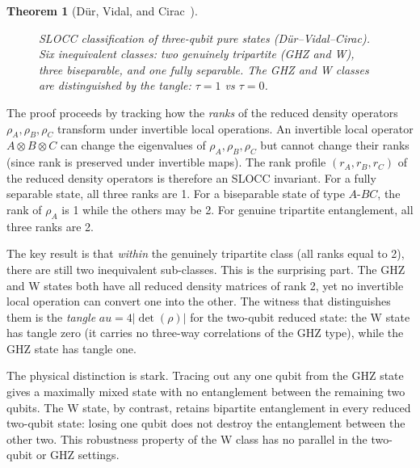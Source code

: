 \documentclass[12pt, a4paper, oneside]{report}
\theoremstyle{plain}
\newtheorem{theorem}{Theorem}[chapter]
\theoremstyle{definition}
\theoremstyle{remark}
\begin{document}
\begin{theorem}[Dür, Vidal, and Cirac~\cite{dur2000}]
\begin{figure}[htbp]
		\caption{SLOCC classification of three-qubit pure states (D\"{u}r--Vidal--Cirac). Six inequivalent classes: two genuinely tripartite (GHZ and W), three biseparable, and one fully separable. The GHZ and W classes are distinguished by the tangle: $\tau = 1$ vs $\tau = 0$.}
		\label{fig:sloce-classes}
	\end{figure}
\end{theorem}

The proof proceeds by tracking how the \emph{ranks} of the reduced density operators
$\rho_A, \rho_B, \rho_C$ transform under invertible local operations. An invertible local
operator $A \otimes B \otimes C$ can change the eigenvalues of $\rho_A, \rho_B, \rho_C$
but cannot change their ranks (since rank is preserved under invertible maps). The rank
profile $(r_A, r_B, r_C)$ of the reduced density operators is therefore an SLOCC invariant.
For a fully separable state, all three ranks are 1. For a biseparable state of type $A$-$BC$,
the rank of $\rho_A$ is 1 while the others may be 2. For genuine tripartite entanglement,
all three ranks are 2.

The key result is that \emph{within} the genuinely tripartite class (all ranks equal to 2),
there are still two inequivalent sub-classes. This is the surprising part. The GHZ and W
states both have all reduced density matrices of rank 2, yet no invertible local operation
can convert one into the other. The witness that distinguishes them is the \emph{tangle}
$	au = 4|\det(\rho)|$ for the two-qubit reduced state: the W state has tangle zero (it
carries no three-way correlations of the GHZ type), while the GHZ state has tangle one.

The physical distinction is stark. Tracing out any one qubit from the GHZ state gives a
maximally mixed state with no entanglement between the remaining two qubits. The W state,
by contrast, retains bipartite entanglement in every reduced two-qubit state: losing one
qubit does not destroy the entanglement between the other two. This robustness property of
the W class has no parallel in the two-qubit or GHZ settings.
\end{document}

